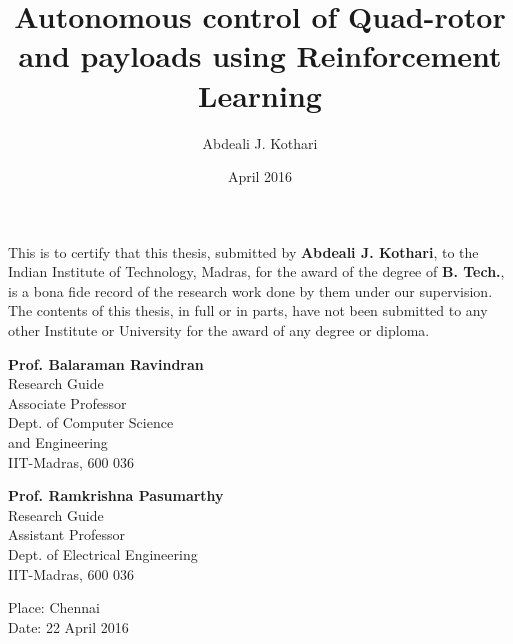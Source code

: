 \documentclass[hidelinks,BTech]{iitmdiss}
\begin{document}

\title{Autonomous control of Quad-rotor and payloads using Reinforcement Learning}

\author{Abdeali J. Kothari}

\date{April 2016}

\maketitle

\certificate

\vspace*{0.5in}

\noindent This is to certify that this thesis, submitted by {\bf Abdeali J. Kothari}, to the Indian Institute of Technology, Madras, for the award of the degree of {\bf B. Tech.}, is a bona fide record of the research work done by them under our supervision. The contents of this thesis, in full or in parts, have not been submitted to any other Institute or University for the award of any degree or diploma.

\vspace*{1.5in}

\begin{singlespacing}

\begin{minipage}[t]{0.45\textwidth}
  {\bf Prof. Balaraman Ravindran} \\
  Research Guide \\
  Associate Professor \\
  Dept. of Computer Science \\
  and Engineering \\
  IIT-Madras, 600 036
\end{minipage}
\hfill
\begin{minipage}[t]{0.45\textwidth}
  {\bf Prof. Ramkrishna Pasumarthy} \\
  Research Guide \\
  Assistant Professor \\
  Dept. of Electrical Engineering \\
  IIT-Madras, 600 036
\end{minipage}

\end{singlespacing}

\vspace*{0.25in}
\noindent Place: Chennai\\
Date: 22 April 2016
\end{document}
